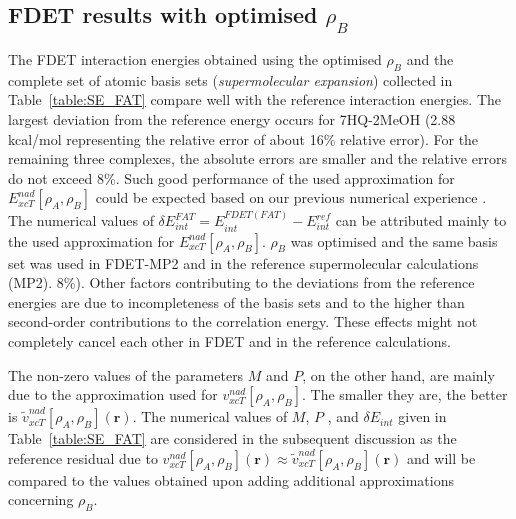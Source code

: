\documentclass[journal=jctcce,manuscript=article]{achemso}
\newcommand{\nr}[1]{\color{red}#1\color{black}}
\begin{document}
\subsection{FDET results with optimised $\rho_B$}
The FDET interaction energies  obtained using the optimised $\rho_B$ and the complete set of atomic basis sets ({\it supermolecular expansion}) collected in Table~\ref{table:SE_FAT} compare well with the reference interaction energies.  
The largest deviation from the reference energy occurs for 7HQ-2MeOH (2.88 kcal/mol representing the relative error of about 16\% relative error). 
For the remaining three complexes, the absolute errors are smaller and the relative errors do not exceed 8\%.
Such good performance of the used approximation for $E_{xcT}^{nad}[\rho_A,\rho_B]$
could be expected based on our previous numerical experience \cite{Wesolowski2003a,Kevorkyants2006,Dulak2007a}. The numerical values of $
\delta E_{int}^{FAT}=E^{FDET(FAT)}_{int}-E_{int}^{ref}\label{eq:def_err_en}$
 can be attributed mainly to the used  approximation for $E_{xcT}^{nad}[\rho_A,\rho_B]$. 
 $\rho_B$ was optimised and the same basis set was used in \nr{FDET-MP2 } and \nr{in } the reference supermolecular calculations (MP2). 8\%). 
Other factors contributing to the deviations from the reference energies are due to incompleteness of the basis sets and to the higher than second-order contributions to the correlation energy. These effects might not completely cancel each other in FDET and in the reference calculations. 

The non-zero values of  the parameters $M$ and $P$, on the other hand, \nr{are mainly due to } the approximation \nr{used for } $v_{xcT}^{nad}[\rho_A,\rho_B]$. 
The \nr{smaller } they are\nr{, } the better is $\tilde{v}_{xcT}^{nad}[\rho_A,\rho_B](\mathbf{r})$.
The numerical values of \nr{$M$, $P$ }, and $\delta E_{int}$ given in Table~\ref{table:SE_FAT} are considered in the subsequent discussion as the reference residual due to ${v}_{xcT}^{nad}[\rho_A,\rho_B](\mathbf{r})\approx\tilde{v}_{xcT}^{nad}[\rho_A,\rho_B](\mathbf{r})$ and will be compared to the values obtained upon adding additional approximations concerning  $\rho_B$.
\end{document}

